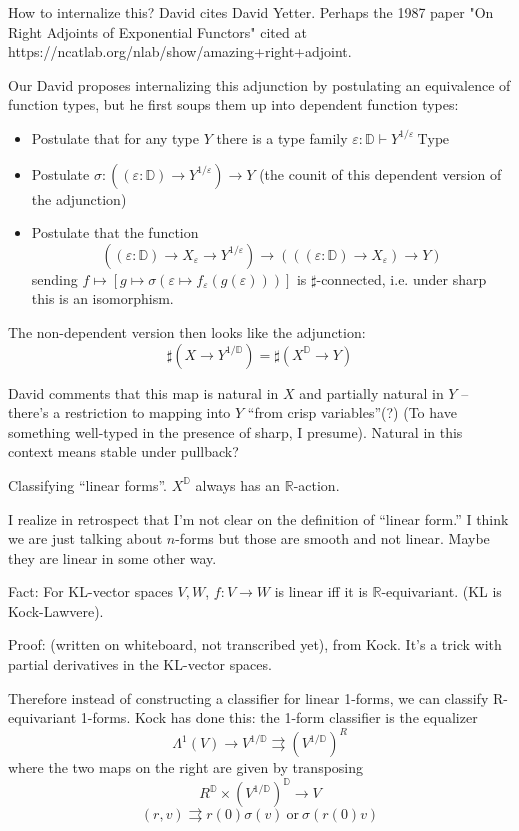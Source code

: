 \documentclass[17pt]{extarticle}
\begin{document}
How to internalize this? David cites David Yetter. Perhaps the 1987 paper "On Right Adjoints of Exponential Functors" cited at https://ncatlab.org/nlab/show/amazing+right+adjoint.

Our David proposes internalizing this adjunction by postulating an equivalence of function types, but he first soups them up into dependent function types:

\begin{itemize}
\item Postulate that for any type $Y$ there is a type family $\varepsilon: \mathbb{D}\vdash Y^{1/\varepsilon}\  \mathrm{Type}$
\item Postulate $\sigma:((\varepsilon: \mathbb{D}) \to Y^{1/\varepsilon}) \to Y$ (the counit of this dependent version of the adjunction)
\item Postulate that the function $$((\varepsilon: \mathbb{D}) \to X_{\varepsilon} \to Y^{1/\varepsilon}) \to (((\varepsilon: \mathbb{D})\to X_{\varepsilon}) \to Y)$$ sending $f\mapsto [g\mapsto \sigma(\varepsilon\mapsto f_{\varepsilon}(g(\varepsilon)))]$ is $\sharp$-connected, i.e. under sharp this is an isomorphism.
\end{itemize}

The non-dependent version then looks like the adjunction: $$\sharp(X\to Y^{1/\mathbb{D}}) = \sharp(X^{\mathbb{D}} \to Y)$$

David comments that this map is natural in $X$ and partially natural in $Y$ -- there's a restriction to mapping into $Y$ ``from crisp variables''(?) (To have something well-typed in the presence of sharp, I presume). Natural in this context means stable under pullback?

Classifying ``linear forms''. $X^{\mathbb{D}}$ always has an $\mathbb{R}$-action.

I realize in retrospect that I'm not clear on the definition of ``linear form.'' I think we are just talking about $n$-forms but those are smooth and not linear. Maybe they are linear in some other way.

Fact: For KL-vector spaces $V, W$, $f:V\to W$ is linear iff it is $\mathbb{R}$-equivariant. (KL is Kock-Lawvere).

Proof: (written on whiteboard, not transcribed yet), from Kock. It's a trick with partial derivatives in the KL-vector spaces.

Therefore instead of constructing a classifier for linear 1-forms, we can classify R-equivariant 1-forms. Kock has done this: the 1-form classifier is the equalizer $$\Lambda^1(V)\to V^{1/\mathbb{D}} \rightrightarrows  (V^{1/\mathbb{D}})^R$$
where the two maps on the right are given by transposing $$R^{\mathbb{D}} \times (V^{1/\mathbb{D}})^{\mathbb{D}}\to V$$ $$(r, v) \rightrightarrows r(0)\sigma(v) \mathrm{\ or\ }\sigma(r(0)v)$$
\end{document}
